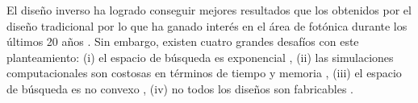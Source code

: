 El diseño inverso ha logrado conseguir mejores resultados que los obtenidos por el
diseño tradicional por lo que ha ganado interés en el área de fotónica durante
los últimos 20 años \citep{Su2018, Molesky2018, Campbell2019}. 
Sin embargo, existen cuatro grandes desafíos con este planteamiento:
(i) el espacio de búsqueda es exponencial \citep{Vuckovic2019}, 
(ii) las simulaciones computacionales son costosas en términos de tiempo y memoria \citep{Kudyshev2020}, 
(iii) el espacio de búsqueda es no convexo \citep{Su2018},
(iv) no todos los diseños son fabricables \citep{Su2020}.




